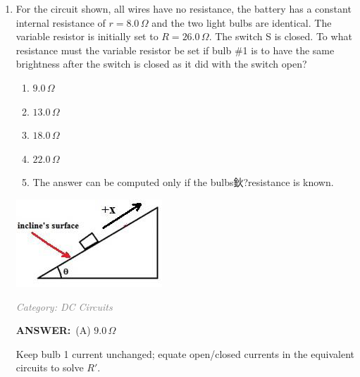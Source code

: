 ﻿\documentclass[12pt, a4paper]{article}
\makeatletter
\newcommand{\finalanswer}[1]{\textbf{ANSWER:}~#1}
\newif\if@categoryprinted
\newcommand{\category}[1]{\if@categoryprinted\relax\else\textit{\textcolor{gray}{Category: #1}}\global\@categoryprintedtrue\fi}
\makeatother
\begin{document}
\begin{CJK*}{UTF8}{gbsn}
\begin{enumerate}[itemsep=1.0em, topsep=0.6em]
\item \label{prob:22}
\noindent\begin{minipage}[t]{0.6\linewidth}
\vspace{0pt}
For the circuit shown, all wires have no resistance, the battery has a constant internal resistance of $r = 8.0\,\Omega$ and the two light bulbs are identical. The variable resistor is initially set to $R = 26.0\,\Omega$. The switch S is closed. To what resistance must the variable resistor be set if bulb \#1 is to have the same brightness after the switch is closed as it did with the switch open?
\begin{enumerate}[label=(\Alph*)]
    \item $9.0\,\Omega$
    \item $13.0\,\Omega$
    \item $18.0\,\Omega$
    \item $22.0\,\Omega$
    \item The answer can be computed only if the bulbs鈥?resistance is known.
\end{enumerate}
\end{minipage}%
\hfill
\begin{minipage}[t]{0.32\linewidth}
\vspace{0pt}
\centering
\includegraphics[width=\linewidth]{Problem_23_Figure.png}
\end{minipage}

\category{DC Circuits}
\begin{answerbox}
\finalanswer{(A) $9.0\,\Omega$}
\end{answerbox}
\begin{insightbox}
Keep bulb 1 current unchanged; equate open/closed currents in the equivalent circuits to solve $R'$.
\end{insightbox}
\begin{solutionbox}


\end{solutionbox}
\end{enumerate}
\end{CJK*}
\end{document}
